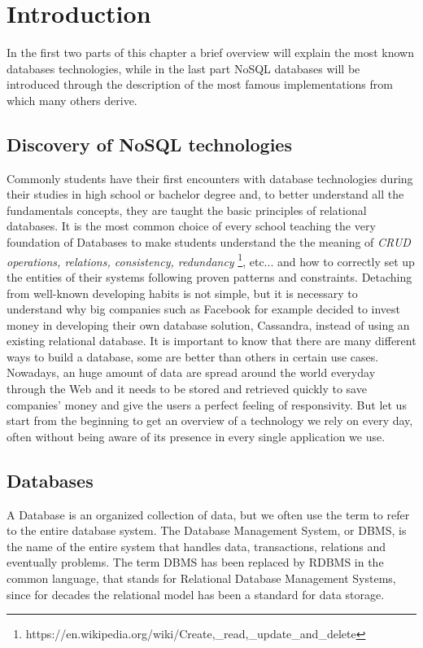 \chapter{Introduction}
\label{cha:intro}

In the first two parts of this chapter a brief overview will explain the most known databases technologies, while in the last part NoSQL databases will be introduced through the description of the most famous implementations from which many others derive.


\section{Discovery of NoSQL technologies}
\label{sec:context}

Commonly students have their first encounters with database technologies during their studies in high school or bachelor degree and, to better understand all the fundamentals concepts, they are taught the basic principles of relational databases.
It is the most common choice of every school teaching the very foundation of Databases to make students understand the the meaning of \textit{CRUD operations, relations, consistency, redundancy} \footnote{https://en.wikipedia.org/wiki/Create,\_read,\_update\_and\_delete}, etc... and how to correctly set up the entities of their systems following proven patterns and constraints.
Detaching from well-known developing habits is not simple, but it is necessary to understand why big companies such as Facebook for example decided to invest money in developing their own database solution, Cassandra, instead of using an existing relational database.
It is important to know that there are many different ways to build a database, some are better than others in certain use cases. Nowadays, an huge amount of data are spread around the world everyday through the Web and it needs to be stored and retrieved quickly to save companies' money and give the users a perfect feeling of responsivity.
But let us start from the beginning to get an overview of a technology we rely on every day, often without being aware of its presence in every single application we use.


\section{Databases}
\label{sec:problem}


A Database is an organized collection of data, but  we often use the term to refer to the entire database system. The Database Management System, or DBMS, is the name of the entire system that handles data, transactions, relations and eventually problems.
The term DBMS has been replaced by RDBMS in the common language, that stands for Relational Database Management Systems, since for decades the relational model has been a standard for data storage.


